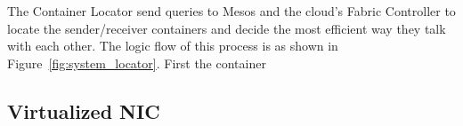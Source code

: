 The Container Locator send queries to Mesos and the cloud's Fabric Controller to locate
the sender/receiver containers and decide the most efficient way they talk with each other.
The logic flow of this process is as shown in Figure~\ref{fig:system_locator}.
First the container 




\subsection{Virtualized NIC}



